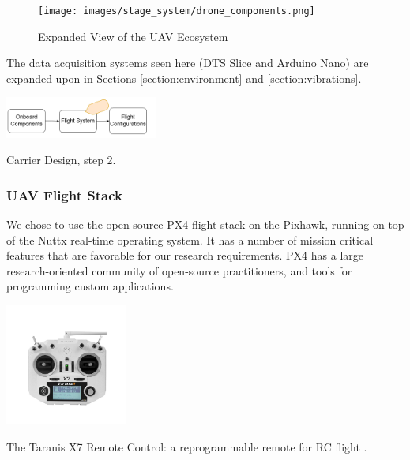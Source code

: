 \begin{figure}[h]
    \raggedright
    \texttt{[image: images/stage\_system/drone\_components.png]}
    \caption{Expanded View of the UAV Ecosystem}
    \label{fig:msp_system}
\end{figure}

The data acquisition systems seen here (DTS Slice and Arduino Nano) are expanded upon in Sections \ref{section:environment} and \ref{section:vibrations}.

\begin{marginfigure}%
  \vspace{1cm}
  \includegraphics[width=5cm]{images/stage_system/drone_setup/components_order2.png}
  \caption{ Carrier Design, step 2.}
\end{marginfigure}


\subsubsection{UAV Flight Stack}


We chose to use the open-source PX4 flight stack \cite{px4_ecosystem} on the Pixhawk, running on top of the Nuttx real-time operating system. It has a number of mission critical features that are favorable for our research requirements. PX4 has a large research-oriented community of open-source practitioners, and tools for programming custom applications. 

\begin{marginfigure}%
  \vspace{2cm}\hspace{0.3cm}
  \includegraphics[width=4cm]{images/stage_system/taranis.jpg}
  \caption{ The Taranis X7 Remote Control: a reprogrammable remote for RC flight \cite{frsky_docs}.}
\end{marginfigure}

